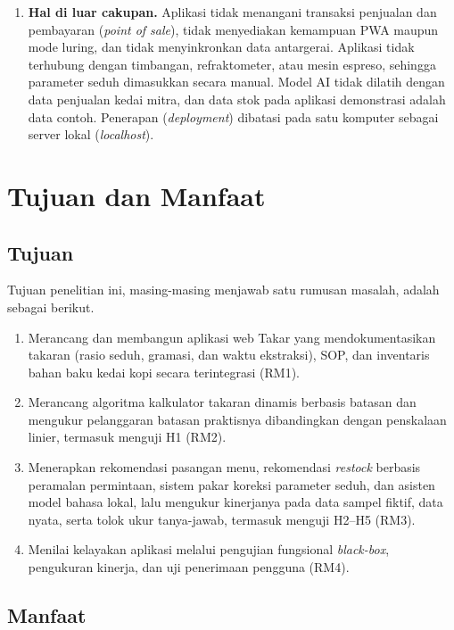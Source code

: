 \begin{enumerate}[label=\arabic*.]
\item \textbf{Hal di luar cakupan.} Aplikasi tidak menangani transaksi penjualan dan pembayaran (\textit{point of sale}), tidak menyediakan kemampuan PWA maupun mode luring, dan tidak menyinkronkan data antargerai. Aplikasi tidak terhubung dengan timbangan, refraktometer, atau mesin espreso, sehingga parameter seduh dimasukkan secara manual. Model AI tidak dilatih dengan data penjualan kedai mitra, dan data stok pada aplikasi demonstrasi adalah data contoh. Penerapan (\textit{deployment}) dibatasi pada satu komputer sebagai server lokal (\textit{localhost}).
\end{enumerate}

\section{Tujuan dan Manfaat}
\label{sec:tujuan-manfaat}

\subsection{Tujuan}
\label{subsec:tujuan}

Tujuan penelitian ini, masing-masing menjawab satu rumusan masalah, adalah sebagai berikut.

\begin{enumerate}[label=\arabic*.]
\item Merancang dan membangun aplikasi web Takar yang mendokumentasikan takaran (rasio seduh, gramasi, dan waktu ekstraksi), SOP, dan inventaris bahan baku kedai kopi secara terintegrasi (RM1).
\item Merancang algoritma kalkulator takaran dinamis berbasis batasan dan mengukur pelanggaran batasan praktisnya dibandingkan dengan penskalaan linier, termasuk menguji H1 (RM2).
\item Menerapkan rekomendasi pasangan menu, rekomendasi \textit{restock} berbasis peramalan permintaan, sistem pakar koreksi parameter seduh, dan asisten model bahasa lokal, lalu mengukur kinerjanya pada data sampel fiktif, data nyata, serta tolok ukur tanya-jawab, termasuk menguji H2--H5 (RM3).
\item Menilai kelayakan aplikasi melalui pengujian fungsional \textit{black-box}, pengukuran kinerja, dan uji penerimaan pengguna (RM4).
\end{enumerate}

\subsection{Manfaat}
\label{subsec:manfaat}

